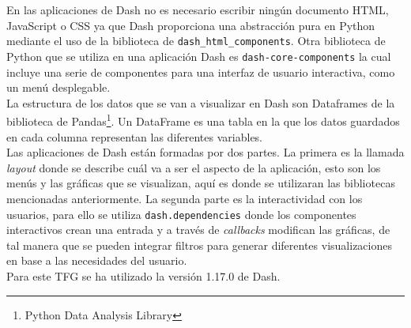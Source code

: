 En las aplicaciones de Dash no es necesario escribir ningún documento HTML, JavaScript o CSS ya que Dash proporciona una abstracción pura en Python mediante el uso de la biblioteca de \texttt{dash\_html\_components}. Otra biblioteca de Python que se utiliza en una aplicación Dash es \texttt{dash-core-components} la cual incluye una serie de componentes para una interfaz de usuario interactiva, como un menú desplegable.\\

La estructura de los datos que se van a visualizar en  Dash son Dataframes de la biblioteca de Pandas\footnote{Python Data Analysis Library}. Un DataFrame es una tabla en la que los datos guardados en cada columna representan las diferentes variables.\\

Las aplicaciones de Dash están formadas por dos partes. La primera es la llamada \textit{layout} donde se describe cuál va a ser el aspecto de la aplicación, esto son los menús y las gráficas que se visualizan, aquí es donde se utilizaran las bibliotecas mencionadas anteriormente. La segunda parte es la interactividad con los usuarios, para ello se utiliza \texttt{dash.dependencies} donde los componentes interactivos crean una entrada y a través de \textit{callbacks} modifican las gráficas, de tal manera que se pueden integrar filtros para generar diferentes visualizaciones en base a las necesidades del usuario.\\

Para este TFG se ha utilizado la versión 1.17.0 de Dash.
















